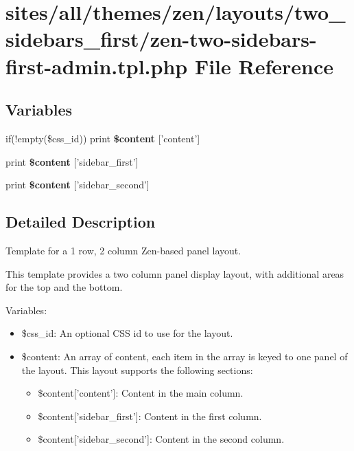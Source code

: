 \hypertarget{zen-two-sidebars-first-admin_8tpl_8php}{
\section{sites/all/themes/zen/layouts/two\_\-sidebars\_\-first/zen-two-sidebars-first-admin.tpl.php File Reference}
\label{zen-two-sidebars-first-admin_8tpl_8php}
}
\subsection*{Variables}
\begin{CompactItemize}
\item 
\hypertarget{zen-two-sidebars-first-admin_8tpl_8php_16767ac2e2b027ec00a0c12535d2ba7a}{
if(!empty(\$css\_\-id)) print \textbf{\$content} \mbox{[}'content'\mbox{]}}
\label{zen-two-sidebars-first-admin_8tpl_8php_16767ac2e2b027ec00a0c12535d2ba7a}

\item 
\hypertarget{zen-two-sidebars-first-admin_8tpl_8php_8fbe76276dfb5a084cc042c32e8e6394}{
print \textbf{\$content} \mbox{[}'sidebar\_\-first'\mbox{]}}
\label{zen-two-sidebars-first-admin_8tpl_8php_8fbe76276dfb5a084cc042c32e8e6394}

\item 
\hypertarget{zen-two-sidebars-first-admin_8tpl_8php_4f8fb8ae436a00e7bdfe8b16bc3f0dd4}{
print \textbf{\$content} \mbox{[}'sidebar\_\-second'\mbox{]}}
\label{zen-two-sidebars-first-admin_8tpl_8php_4f8fb8ae436a00e7bdfe8b16bc3f0dd4}

\end{CompactItemize}


\subsection{Detailed Description}
Template for a 1 row, 2 column Zen-based panel layout.

This template provides a two column panel display layout, with additional areas for the top and the bottom.

Variables:\begin{itemize}
\item \$css\_\-id: An optional CSS id to use for the layout.\item \$content: An array of content, each item in the array is keyed to one panel of the layout. This layout supports the following sections:\begin{itemize}
\item \$content\mbox{[}'content'\mbox{]}: Content in the main column.\item \$content\mbox{[}'sidebar\_\-first'\mbox{]}: Content in the first column.\item \$content\mbox{[}'sidebar\_\-second'\mbox{]}: Content in the second column. \end{itemize}
\end{itemize}
